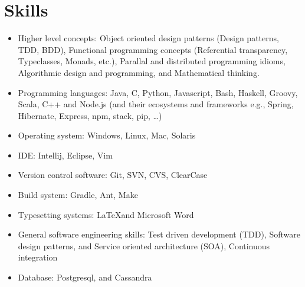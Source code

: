 \section{Skills}
\begin{itemize}
\item Higher level concepts: Object oriented design patterns (Design patterns, TDD, BDD), Functional programming concepts (Referential transparency, Typeclasses, Monads, etc.), Parallal and distributed programming idioms, Algorithmic design and programming, and Mathematical thinking.  

\item Programming languages: Java, C, Python, Javascript, Bash, Haskell, Groovy, Scala, C++ and Node.js (and their ecosystems and frameworks e.g., Spring, Hibernate, Express, npm, stack, pip, \dots)


\item Operating system: Windows, Linux, Mac, Solaris

\item IDE: Intellij, Eclipse, Vim

\item Version control software: Git, SVN, CVS, ClearCase

\item Build system: Gradle, Ant, Make



\item Typesetting systems: \LaTeX and Microsoft Word

\item General software engineering skills: Test driven development (TDD), Software design patterns, and Service oriented architecture (SOA), Continuous integration

\item Database: Postgresql, and Cassandra

\end{itemize}
